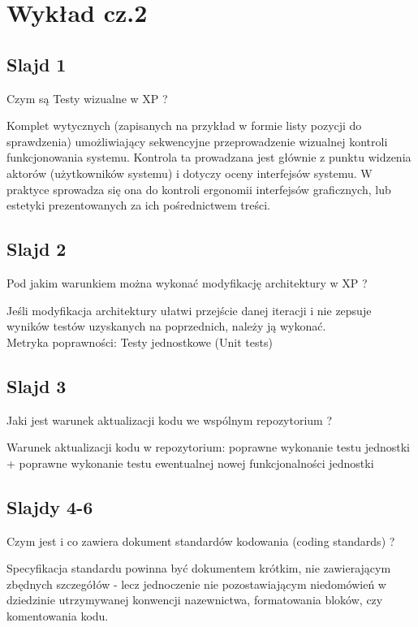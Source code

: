 \documentclass[a4paper,15pt]{article}
\begin{document}
\newpage
\section{ Wykład cz.2 }

\subsection{Slajd 1}
\begin{framed}
Czym są Testy wizualne w XP ?
\end{framed}

Komplet wytycznych (zapisanych na przykład w formie listy pozycji do sprawdzenia) umożliwiający sekwencyjne przeprowadzenie wizualnej kontroli funkcjonowania systemu.  Kontrola ta prowadzana jest głównie z punktu widzenia aktorów (użytkowników systemu) i dotyczy oceny interfejsów systemu. W praktyce sprowadza się ona do kontroli ergonomii interfejsów graficznych, lub estetyki prezentowanych za ich pośrednictwem treści.

\subsection{Slajd 2}

\begin{framed}
Pod jakim warunkiem można wykonać modyfikację architektury w XP ?
\end{framed}
Jeśli modyfikacja architektury ułatwi przejście danej iteracji i nie zepsuje wyników testów uzyskanych na poprzednich, należy ją wykonać. \\ Metryka poprawności: Testy jednostkowe (Unit tests)

\subsection{Slajd 3}
\begin{framed}
Jaki jest warunek aktualizacji kodu we wspólnym repozytorium ?
\end{framed}
Warunek aktualizacji kodu w repozytorium: poprawne wykonanie testu jednostki + poprawne wykonanie testu ewentualnej nowej funkcjonalności jednostki

\subsection{Slajdy 4-6}
\begin{framed}
Czym jest i co zawiera dokument standardów kodowania (coding standards) ?
\end{framed}
Specyfikacja standardu powinna być dokumentem krótkim, nie zawierającym zbędnych szczegółów - lecz jednoczenie nie pozostawiającym niedomówień w dziedzinie utrzymywanej konwencji nazewnictwa, formatowania bloków, czy komentowania kodu. 
\end{document}
